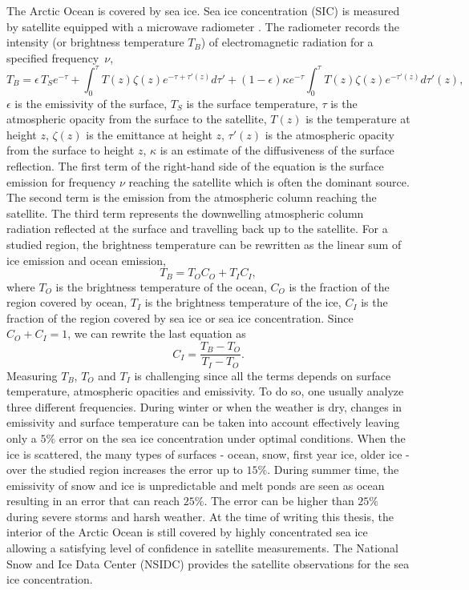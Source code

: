 The Arctic Ocean is covered by sea ice. Sea ice concentration (SIC) is measured by satellite equipped with a microwave radiometer \citep{satellite}. The radiometer records the intensity (or brightness temperature $T_B$) of electromagnetic radiation for a specified frequency~$\nu$,
\begin{equation}
T_B = \epsilon \, T_S e^{-\tau} + \int_0^\tau T(z)\zeta(z) e^{-\tau +\tau'(z)} d\tau' + (1-\epsilon) \kappa e^{-\tau} \int_0^\tau T(z)\zeta(z)e^{-\tau'(z)} d\tau'(z),
\end{equation}
$\epsilon$ is the emissivity of the surface, $T_S$ is the surface temperature, $\tau$ is the atmospheric opacity from the surface to the satellite, $T(z)$ is the temperature at height $z$, $\zeta(z)$ is the emittance at height $z$, $\tau'(z)$ is the atmospheric opacity from the surface to height $z$, $\kappa$ is an estimate of the diffusiveness of the surface reflection. The first term of the right-hand side of the equation is the surface emission for frequency $\nu$ reaching the satellite which is often the dominant source. The second term is the emission from the atmospheric column reaching the satellite. The third term represents the downwelling atmospheric column radiation reflected at the surface and travelling back up to the satellite. For a studied region, the brightness temperature can be rewritten as the linear sum of ice emission  and ocean emission,
\begin{equation}
T_B = T_O C_O + T_I C_I,
\end{equation}
where $T_O$ is the brightness temperature of the ocean, $C_O$ is the fraction of the region covered by ocean, $T_I$ is the brightness temperature of the ice, $C_I$ is the fraction of the region covered by sea ice or sea ice concentration. Since $C_O + C_I = 1$, we can rewrite the last equation as
\begin{equation}
C_I = \frac{T_B - T_O}{T_I - T_O}.
\end{equation}
Measuring $T_B$, $T_O$ and $T_I$ is challenging since all the terms depends on surface temperature, atmospheric opacities and emissivity. To do so, one usually analyze three different frequencies. During winter or when the weather is dry, changes in emissivity and surface temperature can be taken into account effectively leaving only a $5\%$ error on the sea ice concentration under optimal conditions. When the ice is scattered, the many types of surfaces - ocean, snow, first year ice, older ice -  over the studied region increases the error up to $15\%$. During summer time, the emissivity of snow and ice is unpredictable and melt ponds are seen as ocean resulting in an error that can reach $25\%$. The error can be higher than $25\%$ during severe storms and harsh weather. At the time of writing this thesis, the interior of the Arctic Ocean is still covered by highly concentrated sea ice allowing a satisfying level of confidence in satellite measurements. The National Snow and Ice Data Center (NSIDC) provides the satellite observations for the sea ice concentration. 

